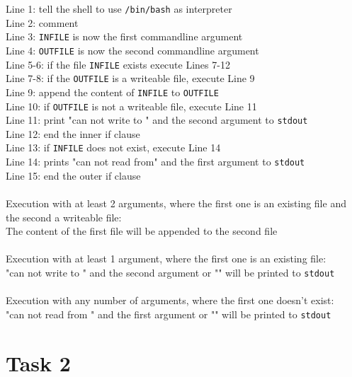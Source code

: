 \documentclass[11pt]{article} %
\begin{document}

Line 1: tell the shell to use \texttt{/bin/bash} as interpreter\\
Line 2: comment\\
Line 3: \texttt{INFILE} is now the first commandline argument\\
Line 4: \texttt{OUTFILE} is now the second commandline argument\\
Line 5-6: if the file \texttt{INFILE} exists execute Lines 7-12\\
Line 7-8: if the \texttt{OUTFILE} is a writeable file, execute Line 9\\
Line 9: append the content of \texttt{INFILE} to \texttt{OUTFILE}\\
Line 10: if \texttt{OUTFILE} is not a writeable file, execute Line 11\\
Line 11: print "can not write to " and the second argument to \texttt{stdout}\\
Line 12: end the inner if clause\\
Line 13: if \texttt{INFILE} does not exist, execute Line 14\\
Line 14: prints "can not read from" and the first argument to \texttt{stdout}\\
Line 15: end the outer if clause\\
\\
Execution with at least 2 arguments, where the first one is an existing file
 and the second a writeable file:\\
The content of the first file will be appended to the second file\\
\\
Execution with at least 1 argument, where the first one is an existing file:\\
"can not write to " and the second argument or "" will be printed to \texttt{stdout}\\
\\
Execution with any number of arguments, where the first one doesn't exist:\\
"can not read from " and the first argument or "" will be printed to \texttt{stdout}\\
\pagebreak

\section{Task 2}

\end{document}
